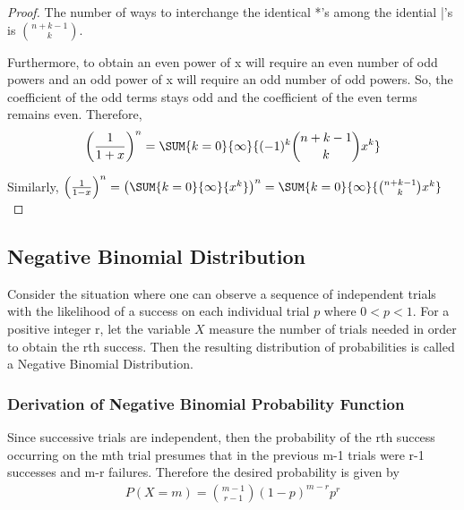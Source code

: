 \documentclass[10pt,]{book}
\theoremstyle{plain}
\theoremstyle{definition}
\theoremstyle{definition}
\numberwithin{equation}{section}
\newcommand{\lt}{ < }
\begin{document}
\begin{proof}
				 The number of ways to interchange the identical *'s among the
				 idential |'s is \(\binom{n+k-1}{k}\). %
\par
Furthermore, to obtain an even power of x will require an even number of odd powers and an odd power of x 
				 will require an odd number of odd powers. So, the 
				 coefficient of the odd terms stays odd and the coefficient of the even terms remains even. Therefore,%
\begin{gather*}
 \left ( \frac{1}{1+x} \right )^n = \SUM {k=0} {\infty} {(-1)^k \binom{n + k - 1}{k} x^k}
\end{gather*}\par
Similarly,%
\( \left ( \frac{1}{1-x} \right )^n = \left ( \SUM {k=0} {\infty} {x^k} \right )^n = \SUM {k=0} {\infty} {\binom{n + k - 1}{k} x^k}\)\end{proof}
\typeout{************************************************}
\typeout{************************************************}
\subsection[Negative Binomial Distribution]{Negative Binomial Distribution}\label{subsection-21}
Consider the situation where one can observe a sequence  of independent trials with the likelihood of a success 
			on each individual trial \(p\) where 
			\( 0 \lt p \lt 1 \).  For a positive integer r, let the variable \(X\) measure the number of 
			trials needed in order to obtain the rth success.
			Then the resulting distribution of probabilities is called a Negative Binomial Distribution.%
\typeout{************************************************}
\typeout{************************************************}
\subsubsection[Derivation of Negative Binomial Probability Function]{Derivation of Negative Binomial Probability Function}\label{subsection-22}
 Since successive trials are independent, then the probability of the rth success occurring on the 
				mth trial presumes that in 
				the previous m-1 trials were r-1 successes and m-r failures.  Therefore the desired probability is given by 
				\begin{gather*}
P(X=m) = \binom{m - 1}{r-1}(1-p)^{m-r}p^r
\end{gather*}
\typeout{************************************************}
\typeout{************************************************}
\end{document}

